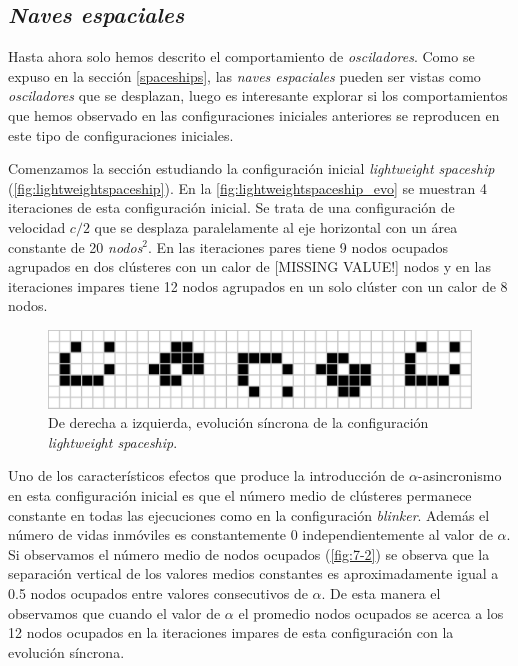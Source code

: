 \documentclass[../proyecto.tex]{memoir}
\begin{document}
\subsection{\textit{Naves espaciales}}
Hasta ahora solo hemos descrito el comportamiento de \textit{osciladores}. Como se expuso en la sección \ref{spaceships}, las \textit{naves espaciales} pueden ser vistas como \textit{osciladores} que se desplazan, luego es interesante explorar si los comportamientos que hemos observado en las configuraciones iniciales anteriores se reproducen en este tipo de configuraciones iniciales. 

Comenzamos la sección estudiando la configuración inicial \textit{lightweight spaceship} (\autoref{fig:lightweightspaceship}). En la \autoref{fig:lightweightspaceship_evo} se muestran 4 iteraciones de esta configuración inicial. Se trata de una configuración de velocidad $c/2$ que se desplaza paralelamente al eje horizontal con un área constante de 20 \textit{nodos}$^2$. En las iteraciones pares tiene 9 nodos ocupados agrupados en dos clústeres con un calor de [MISSING VALUE!] nodos y en las iteraciones impares tiene 12 nodos agrupados en un solo clúster con un calor de 8 nodos.

\begin{figure}[H]
	\centering
    \includegraphics[width=\textwidth]{./images/lightweightspaceship_evo.png}
    \caption{De derecha a izquierda, evolución síncrona de la configuración \textit{lightweight spaceship}.}
    \label{fig:lightweightspaceship_evo}
\end{figure}

Uno de los característicos efectos que produce la introducción de $\alpha$-asincronismo en esta configuración inicial es que el número medio de clústeres permanece constante en todas las ejecuciones como en la configuración \textit{blinker}. Además el número de vidas inmóviles es constantemente 0 independientemente al valor de $\alpha$. Si observamos el número medio de nodos ocupados (\autoref{fig:7-2}) se observa que la separación vertical de los valores medios constantes es aproximadamente igual a 0.5 nodos ocupados entre valores consecutivos de $\alpha$. De esta manera el observamos que cuando el valor de $\alpha$ el promedio nodos ocupados se acerca a los 12 nodos ocupados en la iteraciones impares de esta configuración con la evolución síncrona.
\end{document}
